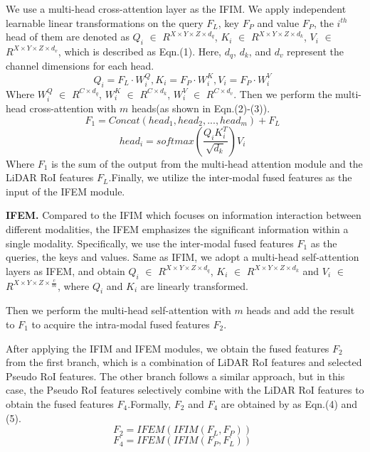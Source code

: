 \begin{sloppypar}
We use a multi-head cross-attention layer as the IFIM. We apply independent learnable linear transformations on the query $F_L$, key $F_P$ and value $F_P$, the $i^{th}$ head of them are denoted as $Q_i$ $\in$ $R^{X \times Y \times Z \times d_q}$, $K_i$ $\in$ $R^{X \times Y \times Z \times d_k}$, $V_i$ $\in$ $R^{X \times Y \times Z \times d_v}$, which is described as Eqn.(1). Here, $d_q$, $d_k$, and $d_v$ represent the channel dimensions for each head.
\begin{equation}
Q_i = F_L \cdot W_{i}^{Q}, K_i = F_P \cdot W_{i}^{K}, V_i = F_P \cdot W_{i}^{V}\enspace
\end{equation}
Where $W_{i}^{Q}$ $\in$ $R^{C \times d_q}$, $W_{i}^{K}$ $\in$ $R^{C \times d_k}$, $W_{i}^{V}$ $\in$ $R^{C \times d_v}$.
Then we perform the multi-head cross-attention with $m$ heads(as shown in Eqn.(2)-(3)).
\begin{equation}
F_1 = Concat(head_1,head_2,...,head_m)+F_L\enspace
\end{equation}
\begin{equation}
head_i= {softmax}{(\frac{Q_iK_{i}^{T}}{\sqrt{d_k}})}V_i\enspace
\end{equation}
Where $F_1$ is the sum of the output from the multi-head attention module and the LiDAR RoI features $F_L$.Finally, we utilize the inter-modal fused features as the input of the IFEM module.

{\bfseries IFEM.} Compared to the IFIM which focuses on information interaction between different modalities, the IFEM emphasizes the significant information within a single modality. Specifically, we use the inter-modal fused features $F_1$ as the queries, the keys and values. Same as IFIM, we adopt a multi-head self-attention layers as IFEM, and obtain  $Q_i$ $\in$ $R^{X \times Y \times Z \times d_q}$, $K_i$ $\in$ $R^{X \times Y \times Z \times d_k}$ and $V_i$ $\in$ $R^{X \times Y \times Z \times \frac{c}{m}}$, where $Q_i$ and $K_i$ are linearly transformed.

Then we perform the multi-head self-attention with $m$ heads and add the result to $F_1$ to acquire the intra-modal fused features $F_2$.

After applying the IFIM and IFEM modules, we obtain the fused features $F_2$ from the first branch, which is a combination of LiDAR RoI features and selected Pseudo RoI features. The other branch follows a similar approach, but in this case, the Pseudo RoI features selectively combine with the LiDAR RoI features to obtain the fused features $F_4$.Formally, $F_2$ and $F_4$ are obtained by as Eqn.(4) and (5).
\begin{equation}
F_2=IFEM(IFIM(F_L,F_P))\enspace
\end{equation}
\begin{equation}
F_4=IFEM(IFIM(F_P,F_L))\enspace
\end{equation}

\end{sloppypar}

